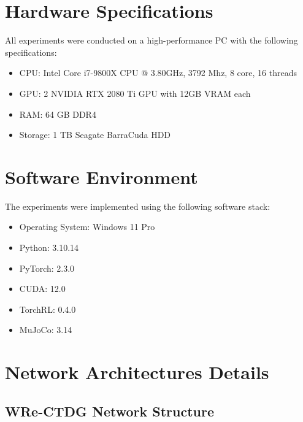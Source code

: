 \section{Hardware Specifications}

All experiments were conducted on a high-performance
PC with the following specifications: 

\begin{itemize}
    \item CPU: Intel Core i7-9800X CPU @ 3.80GHz,
    3792 Mhz, 8 core, 16 threads
    \item GPU: 2 NVIDIA RTX 2080 Ti GPU with 12GB
    VRAM each
    \item RAM: 64 GB DDR4
    \item Storage: 1 TB Seagate BarraCuda HDD
\end{itemize}

\section{Software Environment}

The experiments were implemented using the following software stack:

\begin{itemize}
    \item Operating System: Windows 11 Pro
    \item Python: 3.10.14
    \item PyTorch: 2.3.0
    \item CUDA: 12.0
    \item TorchRL: 0.4.0
    \item MuJoCo: 3.14
\end{itemize}

\section{Network Architectures Details}

\subsection{WRe-CTDG Network Structure}

